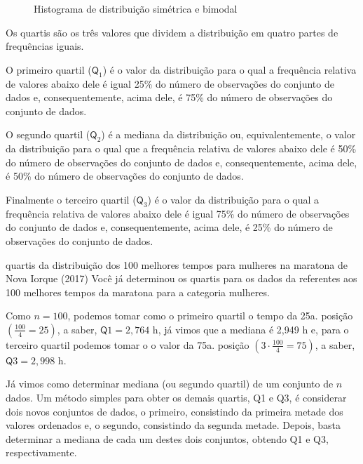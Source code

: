 \begin{figure}[H]
\centering
\capstart

\noindent{}
\caption{Histograma de distribuição simétrica e bimodal}\label{\detokenize{PE104-1:id5}}\label{\detokenize{PE104-1:id20}}\end{figure}


Os quartis são os três valores que dividem a distribuição em quatro partes de frequências iguais.

O primeiro quartil (\(\textsf{Q}_1\)) é o valor da distribuição para o qual a frequência relativa de valores abaixo dele é igual 25\% do número de observações do conjunto de dados e, consequentemente, acima dele, é 75\% do número de observações do conjunto de dados.

O segundo quartil (\(\textsf{Q}_2\)) é a mediana da distribuição ou, equivalentemente, o  valor da distribuição para o qual que a frequência relativa de valores abaixo dele é 50\% do número de observações do conjunto de dados e, consequentemente, acima dele, é 50\% do número de observações do conjunto de dados.

Finalmente o terceiro quartil (\(\textsf{Q}_3\)) é o valor da distribuição
para o qual a frequência relativa de valores abaixo dele é igual 75\% do número de observações do conjunto de dados e, consequentemente, acima dele, é 25\% do número de observações do conjunto de dados.

\begin{example}{quartis da distribuição dos 100 melhores tempos para mulheres na maratona de Nova Iorque (2017)}
Você já determinou os quartis para os dados da  referentes aos 100 melhores tempos da maratona para a categoria mulheres.

Como \(n=100\), podemos tomar como o primeiro quartil o tempo da 25a. posição \(\left (\frac{100}{4}=25\right )\), a saber, \(\textsf{Q}1=2,764\) h, já vimos que a mediana é 2,949 h e, para o terceiro quartil podemos tomar o  o valor da 75a. posição \(\left (3\cdot\frac{100}{4}=75\right )\), a saber, \(\textsf{Q}3=2,998\) h.
\end{example}

Já vimos como determinar mediana (ou segundo quartil) de um conjunto de \(n\) dados. Um método simples para obter os demais quartis, Q1 e Q3, é considerar dois novos conjuntos de dados, o primeiro, consistindo da primeira metade dos valores ordenados e, o segundo, consistindo da segunda metade. Depois, basta determinar a mediana de cada um destes dois conjuntos, obtendo Q1 e Q3, respectivamente.


